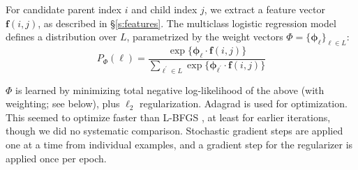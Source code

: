 \documentclass[11pt]{article}
\begin{document}
% 
For candidate parent index $i$ and child index $j$, we extract a feature vector
$\bm{f}(i, j)$, as described in \S\ref{s:features}.
The multiclass logistic regression model defines a distribution over $L$,
parametrized by the weight vectors $\Phi = \{\bm\phi_\ell\}_{\ell \in L}$:
\[
  P_\Phi(\ell)  = \frac{
  	\exp\{\bm\phi_\ell \cdot \bm{f}(i, j)\}
  } {
  	\sum_{\ell^\prime \in L} {
  		\exp\{\bm\phi_{\ell^\prime} \cdot \bm{f}(i, j)\}
  	}
  }
\]

\noindent
$\Phi$ is learned by minimizing total negative log-likelihood of the above
(with weighting; see below), plus $\ell_2$ regularization.
Adagrad \cite{duchi_adaptive_2011} is used for optimization.
This seemed to optimize faster than L-BFGS \cite{byrd_limited_1995}, at least for earlier
iterations, though we did no systematic comparison. Stochastic gradient steps are applied one at a time from individual examples, and a gradient step for the regularizer is applied once per epoch.
\end{document}
